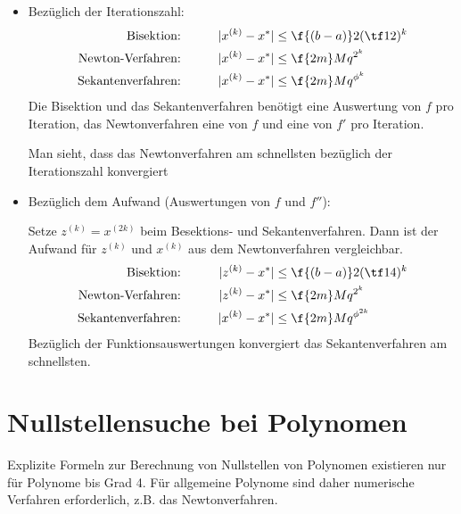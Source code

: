 \documentclass[11pt]{scrbook}
\begin{document}
\begin{nt*}
	\begin{itemize}
		\item
			Bezüglich der Iterationszahl:
			\begin{alignat*}{3}
				\text{Bisektion:}&\qquad& |x^{(k)} -x^*| &\le \f {(b-a)}2 (\tf 12)^k \\
				\text{Newton-Verfahren:}&\qquad& |x^{(k)} -x^*| &\le \f {2m}M q^{2^k} \\
				\text{Sekantenverfahren:}&\qquad& |x^{(k)} -x^*| &\le \f {2m}M q^{\phi^k}
			\end{alignat*}
			Die Bisektion und das Sekantenverfahren benötigt eine Auswertung von $f$ pro Iteration, das Newtonverfahren eine von $f$ und eine von $f'$ pro Iteration.

			Man sieht, dass das Newtonverfahren am schnellsten bezüglich der Iterationszahl konvergiert
		\item
			Bezüglich dem Aufwand (Auswertungen von $f$ und $f''$):

			Setze $z^{(k)} = x^{(2k)}$ beim Besektions- und Sekantenverfahren.
			Dann ist der Aufwand für $z^{(k)}$ und $x^{(k)}$ aus dem Newtonverfahren vergleichbar.
			\begin{alignat*}{3}
				\text{Bisektion:}&\qquad& |z^{(k)} -x^*| &\le \f {(b-a)}2 (\tf 14)^k \\
				\text{Newton-Verfahren:}&\qquad& |z^{(k)} -x^*| &\le \f {2m}M q^{2^k} \\
				\text{Sekantenverfahren:}&\qquad& |x^{(k)} -x^*| &\le \f {2m}M q^{\phi^{2k}} 
			\end{alignat*}
			Bezüglich der Funktionsauswertungen konvergiert das Sekantenverfahren am schnellsten.


	\end{itemize}
\end{nt*}

\section{Nullstellensuche bei Polynomen}

Explizite Formeln zur Berechnung von Nullstellen von Polynomen existieren nur für Polynome bis Grad 4.
Für allgemeine Polynome sind daher numerische Verfahren erforderlich, z.B. das Newtonverfahren.
\end{document}
